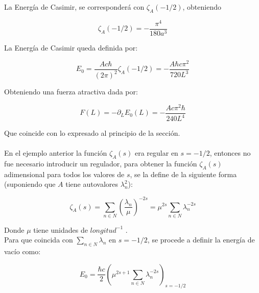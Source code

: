 La Energía de Casimir, se corresponderá con $\zeta _A (-1/2)$, obteniendo 


\begin{equation}
\zeta _A (-1/2) = 
- \frac{\pi ^4}{180 a ^3}
\end{equation}

La Energía de Casimir queda definida por:

\begin{equation}
E _0 =  \frac{A c \hbar}{(2 \pi) ^2}
\zeta _A (-1/2) =
- \frac{A \hbar c \pi ^2}
		{720 L ^3}
\end{equation}

Obteniendo una fuerza atractiva dada por:

\begin{equation}
F(L) = - \partial _L E _0 (L) = 
- \frac{A c \pi ^2 \hbar}{240 L^4}
\end{equation}

Que coincide con lo expresado al principio de la sección. \\ \\


En el ejemplo anterior la función $\zeta _A (s) $ era regular en $s= -1/2$, entonces no fue necesario introducir un regulador, para obtener la función $\zeta _A (s)$ adimensional para todos los valores de $s$, se la define de la siguiente forma (suponiendo que $A$ tiene autovalores $\lambda _n ^2 $):

\begin{equation}
\zeta _A (s) = \sum _{n \in N} \left( \frac{\lambda _n}{\mu }  \right) ^{-2s } = 
\mu ^{2s} \sum _{n \in N } \lambda _n ^{-2s}
\end{equation}

Donde $\mu $ tiene unidades de $longitud ^{-1}$ . \\

Para que coincida con $\underset{ {n \in N}}{  \sum } \lambda _n$ en $s= -1/2$, se procede a definir la energía de vacío como:

\begin{equation}
E _ 0 = 
\frac{\hbar c}{2 }
\left(
	\mu ^{2s+1} \sum _{n \in N} \lambda _n ^{-2s} 
	\right) _{s=-1/2}
\end{equation}